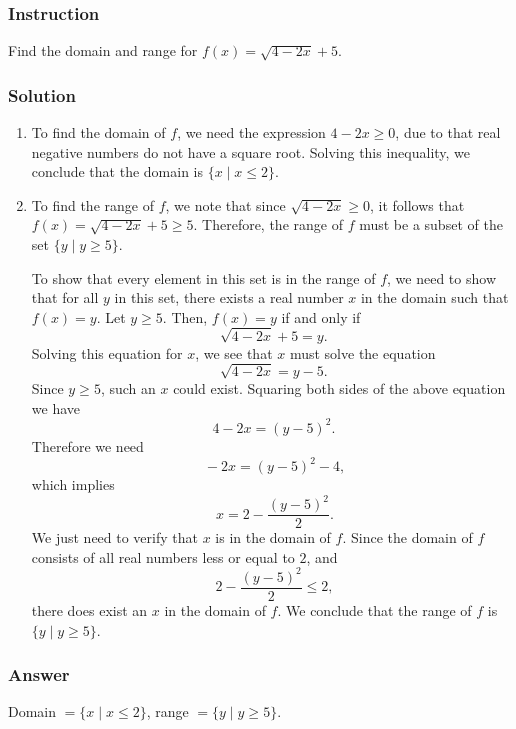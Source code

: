 \documentclass[11pt, letterpaper, oneside]{memoir}
\begin{document}
\subsubsection*{Instruction}

Find the domain and range for $ f(x) = \sqrt{4 - 2x} + 5 $.

\subsubsection*{Solution}

\begin{enumerate}[label=\roman*]
  \item To find the domain of $ f $, we need the expression $ 4 - 2x \ge 0 $, due to that real negative numbers do not have a square root. Solving this inequality, we conclude that the domain is $ \{ x \mid x \le 2 \} $.
  \item To find the range of $ f $, we note that since $ \sqrt{4 - 2x} \ge 0 $, it follows that $ f(x) = \sqrt{4 - 2x} + 5 \ge 5 $. Therefore, the range of $ f $ must be a subset of the set $ \{ y \mid y \ge 5 \} $.

    To show that every element in this set is in the range of $ f $, we need to show that for all $ y $ in this set, there exists a real number $ x $ in the domain such that $ f(x) = y $. Let $ y \ge 5 $. Then, $ f(x) = y $ if and only if
    $$ \phantom{.}
    \sqrt{4 - 2x} + 5 = y
    .$$
    Solving this equation for $ x $, we see that $ x $ must solve the equation
    $$ \phantom{.}
    \sqrt{4 - 2x}= y - 5
    .$$
    Since $ y \ge 5 $, such an $ x $ could exist. Squaring both sides of the above equation we have
    $$ \phantom{.}
    4-2x = (y - 5)^2
    .$$
    Therefore we need
    $$ \phantom{,}
    -2x= (y - 5)^2 - 4
    ,$$
    which implies
    $$ \phantom{,}
    x= 2 -\frac{(y - 5)^2}{2}
    .$$
    We just need to verify that $ x $ is in the domain of $ f $. Since the domain of $ f $ consists of all real numbers less or equal to $ 2 $, and
    $$ \phantom{,}
    2 -\frac{(y - 5)^2}{2} \le 2
    ,$$
    there does exist an $ x $ in the domain of $ f $. We conclude that the range of $ f $ is $ \{ y \mid y \ge 5 \} $.
\end{enumerate}

\subsubsection*{Answer}

Domain $ = \{ x \mid x \le 2 \} $, range $ = \{ y \mid y \ge 5 \} $.
\end{document}
